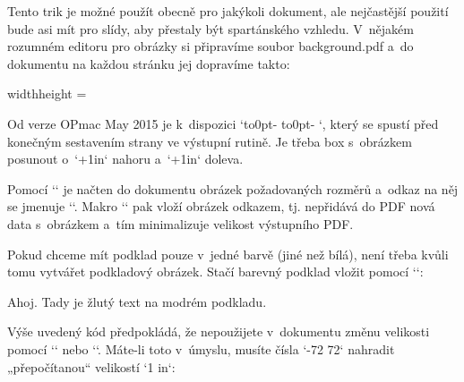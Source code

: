 { 


Tento trik je možné použít obecně pro jakýkoli dokument, ale nejčastější použití bude asi mít pro slídy, aby přestaly být spartánského vzhledu. V~nějakém rozumném editoru pro obrázky si připravíme soubor background.pdf a~do dokumentu na každou stránku jej dopravíme takto: 

\begtt
\def\prepghook{\vbox to0pt{\kern-\voffset\kern-1in 
   \hbox to0pt{\kern-\hoffset\kern-1in\background\hss}\vss}%
   \nointerlineskip 
} 
\pdfximage width\pdfpagewidth height 
\mathchardef\picbackground=\pdflastximage 
\def\background{\pdfrefximage\picbackground} 
\endtt


Od verze OPmac May 2015 je k~dispozici `\prepghook`, který se spustí před konečným sestavením strany ve výstupní rutině. Je třeba box s~obrázkem posunout o~`\voffset+1in` nahoru a~`\hoffset+1in` doleva. 



Pomocí `\pdfximage` je načten do dokumentu obrázek požadovaných rozměrů a~odkaz na něj se jmenuje `\picbackground`. Makro `\background` pak vloží obrázek odkazem, tj. nepřidává do PDF nová data s~obrázkem a~tím minimalizuje velikost výstupního PDF. 



Pokud chceme mít podklad pouze v~jedné barvě (jiné než bílá), není třeba kvůli tomu vytvářet podkladový obrázek. Stačí barevný podklad vložit pomocí `\pdfliteral`: 

\begtt
\def\prepghook{\pdfliteral{q \bgcolor\space k -0.996264 0 0 0.996264 -72 72 cm 
  \nopt{\hoffset} \nopt{\voffset} -\nopt{\pdfpagewidth} -\nopt{\pdfpageheight} re f Q}} 
\def\nopt#1{\expandafter\ignorept\the#1} 
 
\def\setbasecolor#1{#1\expandafter\setbasecolorA#1\pdfblackcolor} 
\def\setbgcolor#1{\expandafter\setbasecolorA#1\bgcolor} 
\def\setbasecolorA#1#2#3{\def#3{#2}} 
 
\setbasecolor\Yellow 
\setbgcolor\Blue 
 
Ahoj. Tady je žlutý text na modrém podkladu. 
\endtt


Výše uvedený kód předpokládá, že nepoužijete v~dokumentu změnu velikosti pomocí `\magnification` nebo `\magscale`. Máte-li toto v~úmyslu, musíte čísla `-72 72` nahradit „přepočítanou“ velikostí `1 in`: 

\begtt
\def\prepghook{\dimen0=.996264truein 
  \pdfliteral{q \bgcolor\space k -0.996264 0 0 0.996264 -\nopt{\dimen0 } \nopt{\dimen0 } cm 
  \nopt{\hoffset} \nopt{\voffset} -\nopt{\pdfpagewidth} -\nopt{\pdfpageheight} re f Q}} 
\endtt

}
